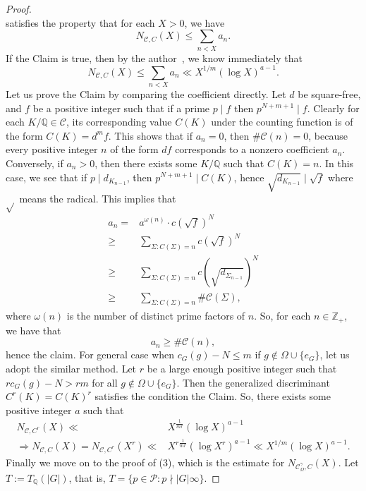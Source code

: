 \documentclass[12pt,a4paper]{amsart}
\numberwithin{equation}{section}%
\theoremstyle{plain}%
\theoremstyle{definition}%
\theoremstyle{remark}%
\begin{document}
\begin{proof}
\begin{equation*}
    	\end{equation*}
    	satisfies the property that for each $X>0$, we have
    	\begin{equation*}
    		N_{\mathcal{C},C}(X)\leq\sum_{n<X}a_{n}.
    	\end{equation*}
    	If the Claim is true, then by the author~\cite[Corollary 5.4]{wang2026invariant}, we know immediately that 
    	\begin{equation*}
    		N_{\mathcal{C},C}(X)\leq\sum_{n<X}a_{n}\ll X^{1/m}(\log X)^{a-1}.
    	\end{equation*}
    	Let us prove the Claim by comparing the coefficient directly.
    	Let $d$ be square-free, and $f$ be a positive integer such that if a prime $p\mid f$ then $p^{N+m+1}\mid f$.
    	Clearly for each $K/\mathbb{Q}\in\mathcal{C}$, its corresponding value $C(K)$ under the counting function is of the form $C(K)=d^{m}f$.
    	This shows that if $a_{n}=0$, then $\#\mathcal{C}(n)=0$, because every positive integer $n$ of the form $df$ corresponds to a nonzero coefficient $a_{n}$.
    	Conversely, if $a_{n}>0$, then there exists some $K/\mathbb{Q}$ such that $C(K)=n$.
    	In this case, we see that if $p\mid d_{K_{n-1}}$, then $p^{N+m+1}\mid C(K)$, hence $\sqrt{d_{K_{n-1}}}\mid\sqrt{f}$ where $\sqrt{}$ means the radical.
    	This implies that
    	\begin{align*}
    		a_{n}=&a^{\omega(n)}\cdot c(\sqrt{f})^{N} \\
    		\geq &\sum_{\Sigma:C(\Sigma)=n}c(\sqrt{f})^{N} \\
    		\geq &\sum_{\Sigma:C(\Sigma)=n}c(\sqrt{d_{\Sigma_{n-1}}})^{N} \\
    		\geq &\sum_{\Sigma:C(\Sigma)=n}\#\mathcal{C}(\Sigma),
    	\end{align*}
    	where $\omega(n)$ is the number of distinct prime factors of $n$.
    	So, for each $n\in\mathbb{Z}_{+}$, we have that
    	\begin{equation*}
    		a_{n}\geq\#\mathcal{C}(n),
    	\end{equation*}
    	hence the claim.
    	For general case when $c_{G}(g)-N\leq m$ if $g\notin\Omega\cup\{e_{G}\}$, let us adopt the similar method.
    	Let $r$ be a large enough positive integer such that $rc_{G}(g)-N>rm$ for all $g\notin\Omega\cup\{e_{G}\}$.
    	Then the generalized discriminant $C^{r}(K)=C(K)^{r}$ satisfies the condition the Claim.
    	So, there exists some positive integer $a$ such that
    	\begin{align*}
    		N_{\mathcal{C},C^{r}}(X)\ll& X^{\frac{1}{mr}}(\log X)^{a-1} \\
    		\Rightarrow N_{\mathcal{C},C}(X)=N_{\mathcal{C},C^{r}}(X^{r})\ll&X^{r\frac{1}{mr}}(\log X^{r})^{a-1}\ll X^{1/m}(\log X)^{a-1}.
    	\end{align*}
    	Finally we move on to the proof of (3), which is the estimate for $N_{\mathcal{C}_{\Omega}^{\gamma},C}(X)$.
    	Let $T:=T_{\mathbb{Q}}(\lvert G\rvert)$, that is, $T=\{p\in\mathcal{P}: p\nmid\lvert G\rvert\infty\}$.
    	

\end{proof}
\end{document}
